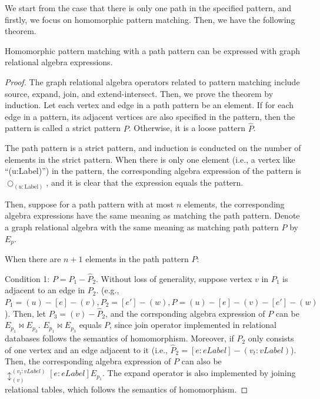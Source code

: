We start from the case that there is only one path in the specified pattern, and firstly, we focus on homomorphic pattern matching.
Then, we have the following theorem.

\begin{theorem}
    Homomorphic pattern matching with a path pattern can be expressed with graph relational algebra expressions.
\end{theorem}
\begin{proof}
    The graph relational algebra operators related to pattern matching include source, expand, join, and extend-intersect.
    Then, we prove the theorem by induction.
    Let each vertex and edge in a path pattern be an element.
    If for each edge in a pattern, its adjacent vertices are also specified in the pattern, then the pattern is called a strict pattern $P$.
    Otherwise, it is a loose pattern $\hat{P}$.

    The path pattern is a strict pattern, and induction is conducted on the number of elements in the strict pattern.
    When there is only one element (i.e., a vertex like ``(u:Label)'') in the pattern, the corresponding algebra expression of the pattern is $\bigcirc_{(u:\text{Label})}$, and it is clear that the expression equals the pattern.

    Then, suppose for a path pattern with at most $n$ elements, the corresponding algebra expressions have the same meaning as matching the path pattern.
    Denote a graph relational algebra with the same meaning as matching path pattern $P$ by $E_p$.

    When there are $n + 1$ elements in the path pattern $P$:



    Condition 1: $P = P_1 - \hat{P}_2$.
    Without loss of generality, suppose vertex $v$ in $P_1$ is adjacent to an edge in $P_2$.
    (e.g., $P_1 = (u)-[e]-(v), P_2 = [e']-(w), P = (u)-[e]-(v)-[e']-(w)$).
    Then, let $P_3 = (v)-\hat{P}_2$, and the corrsponding algebra expression of $P$ can be $E_{p_1} \Join E_{p_3}$.
    $E_{p_1} \Join E_{p_3}$ equals $P$, since join operator implemented in relational databases follows the semantics of homomorphism.
    Moreover, if $\hat{P}_2$ only consists of one vertex and an edge adjacent to it (i.e., $\hat{P}_2 = [e:eLabel]-(v_t:vLabel)$).
    Then, the corresponding algebra expression of $P$ can also be $\updownarrow_{(v)}^{(v_t:vLabel)}[e:eLabel]E_{p_1}$.
    The expand operator is also implemented by joining relational tables, which follows the semantics of homomorphism.


\end{proof}
